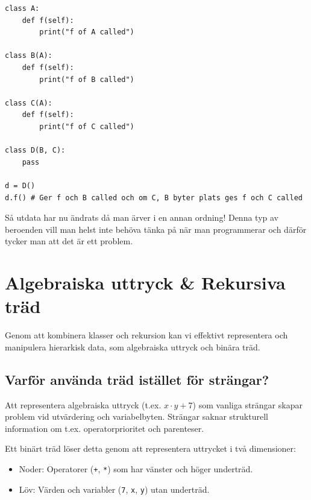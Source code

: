 \documentclass[10pt,a4paper]{report}
\begin{document}
\begin{lstlisting}
class A:
    def f(self):
        print("f of A called")

class B(A):
    def f(self):
        print("f of B called")

class C(A):
    def f(self):
        print("f of C called")

class D(B, C):
    pass

d = D()
d.f() # Ger f och B called och om C, B byter plats ges f och C called
\end{lstlisting}

Så utdata har nu ändrats då man ärver i en annan ordning! Denna typ av beroenden vill man helst inte behöva tänka på när man programmerar och därför tycker man att det är ett problem. 


\section{Algebraiska uttryck \& Rekursiva träd}

Genom att kombinera   klasser   och   rekursion   kan vi effektivt representera och manipulera hierarkisk data, som algebraiska uttryck och binära träd.

\subsection{Varför använda träd istället för strängar?}
Att representera algebraiska uttryck (t.ex. $x \cdot y + 7$) som vanliga strängar skapar problem vid utvärdering och variabelbyten. Strängar saknar strukturell information om t.ex. operatorprioritet och parenteser. 

Ett   binärt träd   löser detta genom att representera uttrycket i två dimensioner:
\begin{itemize}[leftmargin=*]
    \item   Noder:   Operatorer (\texttt{+}, \texttt{*}) som har vänster och höger underträd.
    \item   Löv:   Värden och variabler (\texttt{7}, \texttt{x}, \texttt{y}) utan underträd.
\end{itemize}

\begin{center}
\quad \quad
{}
\end{center}
\end{document}
